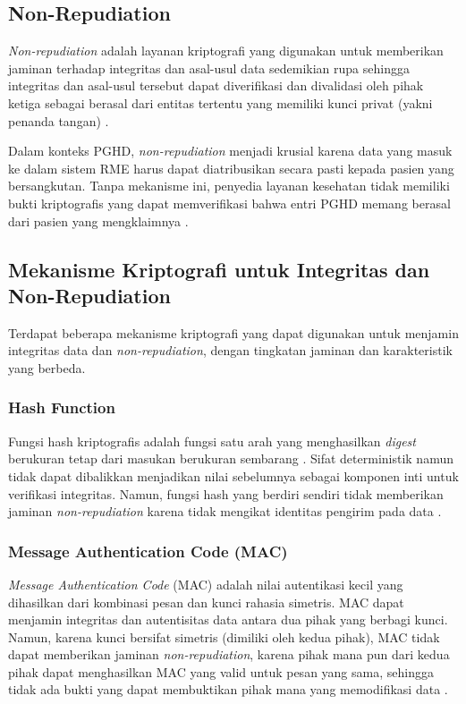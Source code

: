 \subsection{Non-Repudiation}\label{non-repudiation}

\textit{Non-repudiation} adalah layanan kriptografi yang digunakan untuk memberikan jaminan terhadap integritas dan asal-usul data sedemikian rupa sehingga integritas dan asal-usul tersebut dapat diverifikasi dan divalidasi oleh pihak ketiga sebagai berasal dari entitas tertentu yang memiliki kunci privat (yakni penanda tangan) \parencite{NIST_glossary_nonrepudiation,banerjee2025blockchain}.

Dalam konteks PGHD, \textit{non-repudiation} menjadi krusial karena data yang masuk ke dalam sistem RME harus dapat diatribusikan secara pasti kepada pasien yang bersangkutan.
Tanpa mekanisme ini, penyedia layanan kesehatan tidak memiliki bukti kriptografis yang dapat memverifikasi bahwa entri PGHD memang berasal dari pasien yang mengklaimnya \parencite{Khatiwada_Yang_Lin_Blobel_2024_PGHD_Understanding}.

\subsection{Mekanisme Kriptografi untuk Integritas dan Non-Repudiation}\label{sec:mekanisme-kriptografi}

Terdapat beberapa mekanisme kriptografi yang dapat digunakan untuk menjamin integritas data dan \textit{non-repudiation}, dengan tingkatan jaminan dan karakteristik yang berbeda.

\subsubsection{Hash Function}
Fungsi hash kriptografis adalah fungsi satu arah yang menghasilkan \textit{digest} berukuran tetap dari masukan berukuran sembarang \parencite{lei2023analysis,NIST_FIPS186-5}.
Sifat deterministik namun tidak dapat dibalikkan menjadikan nilai sebelumnya sebagai komponen inti untuk verifikasi integritas.
Namun, fungsi hash yang berdiri sendiri tidak memberikan jaminan \textit{non-repudiation} karena tidak mengikat identitas pengirim pada data \parencite{banerjee2025blockchain}.

\subsubsection{Message Authentication Code (MAC)}
\textit{Message Authentication Code} (MAC) adalah nilai autentikasi kecil yang dihasilkan dari kombinasi pesan dan kunci rahasia simetris.
MAC dapat menjamin integritas dan autentisitas data antara dua pihak yang berbagi kunci.
Namun, karena kunci bersifat simetris (dimiliki oleh kedua pihak), MAC tidak dapat memberikan jaminan \textit{non-repudiation}, karena pihak mana pun dari kedua pihak dapat menghasilkan MAC yang valid untuk pesan yang sama, sehingga tidak ada bukti yang dapat membuktikan pihak mana yang memodifikasi data \parencite{NIST_glossary_nonrepudiation}.

